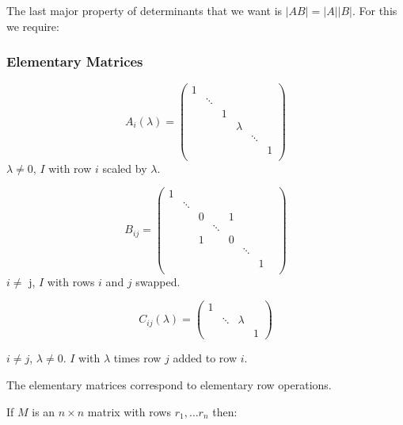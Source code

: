 \documentclass{article}
\theoremstyle{definition} \newtheorem*{definition}{Definition}
\newcommand{\Det}[1]{|#1|}
\begin{document}
   The last major property of determinants that we want is $\Det{AB} =
   \Det{A}\Det{B}$. For this we require:

   \subsubsection*{Elementary Matrices}

   \[
     A_{i}(\lambda) = \left( 
     \begin{matrix}
       1 &        & & & & \\
         & \ddots & & & & \\
         &        & 1 & & & \\
         &        &   & \lambda & & \\
         &        &   &         & \ddots & \\
         &        &   &         &        & 1 \\
     \end{matrix}
     \right)
   \]
   $\lambda \neq 0$, $I$ with row $i$ scaled by $\lambda$.

  \[
    B_{ij} = \left( 
    \begin{matrix}
     1 &  & & & & &  \\
      & \ddots & & & & & \\
      & & 0 & & 1 & &  \\
      & & &  \ddots & &  & &  \\
      & & 1 & & 0 & &  \\
      &  & & & & \ddots & \\
      &  & & & & &1  \\
    \end{matrix}
    \right)
  \]
  $i \neq$ j, $I$ with rows $i$ and $j$ swapped.

  \[
    C_{ij}(\lambda) = \left( 
    \begin{matrix}
      1 &        &         &  \\
        & \ddots & \lambda &  \\
        &        &         & 1
    \end{matrix}
    \right)
  \]

    $i \neq j$, $\lambda \neq 0$. $I$ with $\lambda$ times row $j$ added to 
    row $i$.

    The elementary matrices correspond to elementary row operations.

    If $M$ is an $n \times n$ matrix with rows $r_1,\dots r_n$ then:
   
\end{document}
